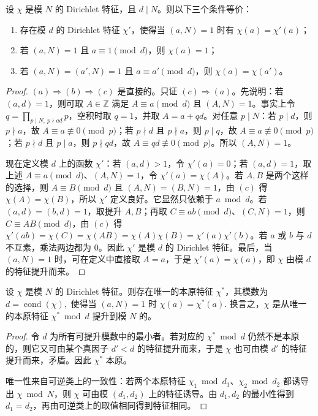 \documentclass[oneside]{AJbook}
\newcommand{\Z}{\mathbb Z}
\providecommand{\cond}{\operatorname{cond}}
\begin{document}
\begin{lemma}[降模判别]
设 \(\chi\) 是模 \(N\) 的 Dirichlet 特征，且 \(d\mid N\)。则以下三个条件等价：
\begin{enumerate}[label=(\alph*)]
  \item 存在模 \(d\) 的 Dirichlet 特征 \(\chi'\)，使得当 \((a,N)=1\) 时有 \(\chi(a)=\chi'(a)\)；
  \item 若 \((a,N)=1\) 且 \(a\equiv1\pmod d\)，则 \(\chi(a)=1\)；
  \item 若 \((a,N)=(a',N)=1\) 且 \(a\equiv a'\pmod d\)，则 \(\chi(a)=\chi(a')\)。
\end{enumerate}
\end{lemma}

\begin{proof}
\((a)\Rightarrow(b)\Rightarrow(c)\) 是直接的。只证 \((c)\Rightarrow(a)\)。先说明：若 \((a,d)=1\)，则可取 \(A\in\Z\) 满足 \(A\equiv a\pmod d\) 且 \((A,N)=1\)。事实上令 \(q=\prod_{p\mid N,\ p\nmid ad}p\)，空积时取 \(q=1\)，并取 \(A=a+qd\)。对任意 \(p\mid N\)：若 \(p\mid d\)，则 \(p\nmid a\)，故 \(A\equiv a\not\equiv0\pmod p\)；若 \(p\nmid d\) 且 \(p\nmid a\)，则 \(p\mid q\)，故 \(A\equiv a\not\equiv0\pmod p\)；若 \(p\nmid d\) 且 \(p\mid a\)，则 \(p\nmid qd\)，故 \(A\equiv qd\not\equiv0\pmod p\)。所以 \((A,N)=1\)。

现在定义模 \(d\) 上的函数 \(\chi'\)：若 \((a,d)>1\)，令 \(\chi'(a)=0\)；若 \((a,d)=1\)，取上述 \(A\equiv a\pmod d\)、\((A,N)=1\)，令 \(\chi'(a)=\chi(A)\)。若 \(A,B\) 是两个这样的选择，则 \(A\equiv B\pmod d\) 且 \((A,N)=(B,N)=1\)，由 \((c)\) 得 \(\chi(A)=\chi(B)\)，所以 \(\chi'\) 定义良好。它显然只依赖于 \(a\bmod d\)。若 \((a,d)=(b,d)=1\)，取提升 \(A,B\)；再取 \(C\equiv ab\pmod d\)、\((C,N)=1\)，则 \(C\equiv AB\pmod d\)，由 \((c)\) 得 \(\chi'(ab)=\chi(C)=\chi(AB)=\chi(A)\chi(B)=\chi'(a)\chi'(b)\)。若 \(a\) 或 \(b\) 与 \(d\) 不互素，乘法两边都为 \(0\)。因此 \(\chi'\) 是模 \(d\) 的 Dirichlet 特征。最后，当 \((a,N)=1\) 时，可在定义中直接取 \(A=a\)，于是 \(\chi'(a)=\chi(a)\)，即 \(\chi\) 由模 \(d\) 的特征提升而来。
\end{proof}

\begin{theorem}[导子的基本刻画]
设 $\chi$ 是模 $N$ 的 Dirichlet 特征。则存在唯一的本原特征 $\chi^\ast$，其模数为
\(
  d=\cond(\chi),
\)
使得当 $(a,N)=1$ 时
\(
  \chi(a)=\chi^\ast(a).
\)
换言之，$\chi$ 是从唯一的本原特征 $\chi^\ast\bmod d$ 提升到模 $N$ 的。
\end{theorem}

\begin{proof}
令 $d$ 为所有可提升模数中的最小者。若对应的 $\chi^\ast\bmod d$ 仍然不是本原的，则它又可由某个真因子 $d'<d$ 的特征提升而来，于是 $\chi$ 也可由模 $d'$ 的特征提升而来，矛盾。因此 $\chi^\ast$ 本原。

唯一性来自可逆类上的一致性：若两个本原特征 $\chi_1\bmod d_1$、$\chi_2\bmod d_2$ 都诱导出 $\chi\bmod N$，则 $\chi$ 可由模
$(d_1,d_2)$ 上的特征诱导。由 $d_1,d_2$ 的最小性得到 $d_1=d_2$，再由可逆类上的取值相同得到特征相同。
\end{proof}
\end{document}
